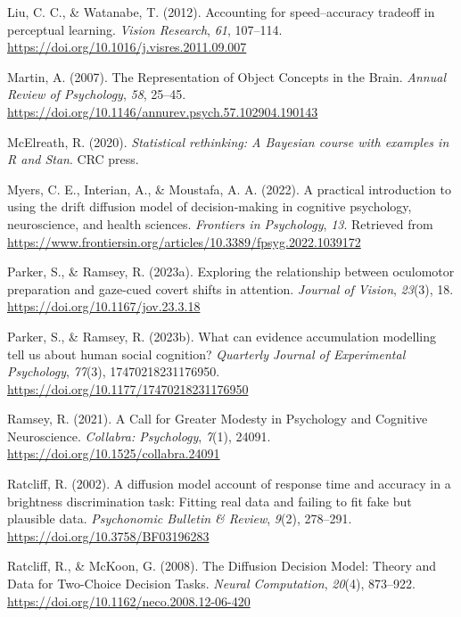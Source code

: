 \documentclass[
  english,
  man, donotrepeattitle,floatsintext]{apa6}
\newlength{\cslhangindent}
\newenvironment{CSLReferences}[2] %
 {\begin{list}{}{%
  \setlength{\itemindent}{0pt}
  \setlength{\leftmargin}{0pt}
  \setlength{\parsep}{0pt}
  \ifodd #1
   \setlength{\leftmargin}{\cslhangindent}
   \setlength{\itemindent}{-1\cslhangindent}
  \fi
  \setlength{\itemsep}{#2\baselineskip}}}
 {\end{list}}
\begin{document}
\begin{CSLReferences}{1}{0}
Liu, C. C., \& Watanabe, T. (2012). Accounting for speed--accuracy tradeoff in perceptual learning. \emph{Vision Research}, \emph{61}, 107--114. \url{https://doi.org/10.1016/j.visres.2011.09.007}

Martin, A. (2007). The {Representation} of {Object Concepts} in the {Brain}. \emph{Annual Review of Psychology}, \emph{58}, 25--45. \url{https://doi.org/10.1146/annurev.psych.57.102904.190143}

McElreath, R. (2020). \emph{Statistical rethinking: {A Bayesian} course with examples in {R} and {Stan}}. CRC press.

Myers, C. E., Interian, A., \& Moustafa, A. A. (2022). A practical introduction to using the drift diffusion model of decision-making in cognitive psychology, neuroscience, and health sciences. \emph{Frontiers in Psychology}, \emph{13}. Retrieved from \url{https://www.frontiersin.org/articles/10.3389/fpsyg.2022.1039172}

Parker, S., \& Ramsey, R. (2023a). Exploring the relationship between oculomotor preparation and gaze-cued covert shifts in attention. \emph{Journal of Vision}, \emph{23}(3), 18. \url{https://doi.org/10.1167/jov.23.3.18}

Parker, S., \& Ramsey, R. (2023b). What can evidence accumulation modelling tell us about human social cognition? \emph{Quarterly Journal of Experimental Psychology}, \emph{77}(3), 17470218231176950. \url{https://doi.org/10.1177/17470218231176950}

Ramsey, R. (2021). A {Call} for {Greater Modesty} in {Psychology} and {Cognitive Neuroscience}. \emph{Collabra: Psychology}, \emph{7}(1), 24091. \url{https://doi.org/10.1525/collabra.24091}

Ratcliff, R. (2002). A diffusion model account of response time and accuracy in a brightness discrimination task: {Fitting} real data and failing to fit fake but plausible data. \emph{Psychonomic Bulletin \& Review}, \emph{9}(2), 278--291. \url{https://doi.org/10.3758/BF03196283}

Ratcliff, R., \& McKoon, G. (2008). The {Diffusion Decision Model}: {Theory} and {Data} for {Two-Choice Decision Tasks}. \emph{Neural Computation}, \emph{20}(4), 873--922. \url{https://doi.org/10.1162/neco.2008.12-06-420}


\end{CSLReferences}
\end{document}

